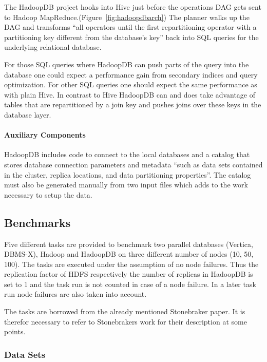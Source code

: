 \documentclass[12pt,a4paper]{scrartcl}		%
\begin{document}
The HadoopDB project hooks into Hive just before the operations DAG gets sent to Hadoop MapReduce.(Figure~\ref{fig:hadoopdbarch}) The planner walks up the DAG and transforms ``all operators until the first repartitioning operator with a partitioning key different from the database's key'' back into SQL queries for the underlying relational database. 

For those SQL queries where HadoopDB can push parts of the query into the database one could expect a performance gain from secondary indices and query optimization. For other SQL queries one should expect the same performance as with plain Hive. In contrast to Hive HadoopDB can and does take advantage of tables that are repartitioned by a join key and pushes joins over these keys in the database layer.

\paragraph{Auxiliary Components}
HadoopDB includes code to connect to the local databases and a catalog that stores database connection parameters and metadata ``such as data sets contained in the cluster, replica locations, and data partitioning properties''. The catalog must also be generated manually from two input files which adds to the work necessary to setup the data.

\subsection{Benchmarks}

Five different tasks are provided to benchmark two parallel databases (Vertica, DBMS-X), Hadoop and HadoopDB on three different number of nodes (10, 50, 100). The tasks are executed under the assumption of no node failures. Thus the replication factor of HDFS respectively the number of replicas in HadoopDB is set to 1 and the task run is not counted in case of a node failure. In a later task run node failures are also taken into account.

The tasks are borrowed from the already mentioned Stonebraker paper\cite{Pavlo09}. It is therefor necessary to refer to Stonebrakers work for their description at some points.

\subsubsection{Data Sets}
\end{document}
